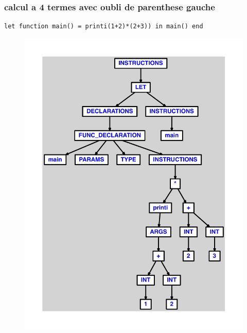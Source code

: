 \documentclass{article}
\begin{document}
\subsubsection{calcul a 4 termes avec oubli de parenthese gauche}
\begin{lstlisting}
let function main() = printi(1+2)*(2+3)) in main() end
\end{lstlisting}
\newpage
\begin{figure}[H]
\centering
\includegraphics[max width=\textwidth]{ast/ast_31.pdf}
\end{figure}
\newpage
\end{document}
